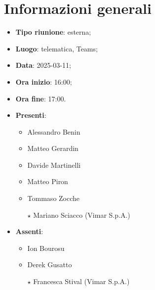 \section{Informazioni generali}
\begin{itemize}
  \item \textbf{Tipo riunione}: esterna;
  \item \textbf{Luogo}: telematica, Teams;
  \item \textbf{Data}: 2025-03-11;
  \item \textbf{Ora inizio}: 16:00;
  \item \textbf{Ora fine}: 17:00.
  
  \item \textbf{Presenti}:
  \begin{itemize}
    \item Alessandro Benin
    \item Matteo Gerardin
    \item Davide Martinelli
    \item Matteo Piron
    \item Tommaso Zocche
    \item[$\star$] Mariano Sciacco (Vimar S.p.A.)
  \end{itemize}

  \item \textbf{Assenti}:
  \begin{itemize}
      \item Ion Bourosu
      \item Derek Gusatto
      \item[$\star$] Francesca Stival (Vimar S.p.A.)
  \end{itemize}
 
\end{itemize}